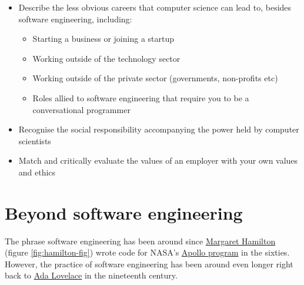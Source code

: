 \documentclass[
]{book}
\providecommand{\tightlist}{%
  \setlength{\itemsep}{0pt}\setlength{\parskip}{0pt}}
\begin{document}
\begin{itemize}
\tightlist
\item
  Describe the less obvious careers that computer science can lead to, besides software engineering, including:

  \begin{itemize}
  \tightlist
  \item
    Starting a business or joining a startup
  \item
    Working outside of the technology sector
  \item
    Working outside of the private sector (governments, non-profits etc)
  \item
    Roles allied to software engineering that require you to be a conversational programmer
  \end{itemize}
\item
  Recognise the social responsibility accompanying the power held by computer scientists
\item
  Match and critically evaluate the values of an employer with your own values and ethics
\end{itemize}

\hypertarget{otheroles}{%
\section{Beyond software engineering}\label{otheroles}}

The phrase software engineering has been around since \href{https://en.wikipedia.org/wiki/Margaret_Hamilton_(software_engineer)}{Margaret Hamilton} (figure \ref{fig:hamilton-fig}) wrote code for NASA's \href{https://en.wikipedia.org/wiki/Apollo_program}{Apollo program} in the sixties. However, the practice of software engineering has been around even longer right back to \href{https://en.wikipedia.org/wiki/Ada_Lovelace}{Ada Lovelace} in the nineteenth century.
\end{document}
